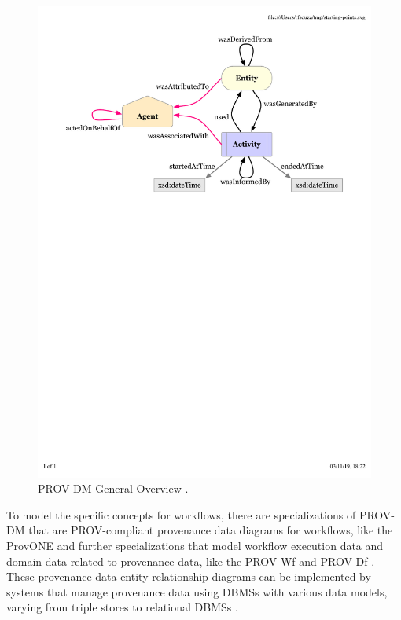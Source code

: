 \begin{figure}[H]
    \centering
    \includegraphics[width=\textwidth,keepaspectratio]{img/prov-dm.pdf}
    \caption{PROV-DM General Overview \cite{Groth2013W3C}.}
    \label{fig:prov_dm}
\end{figure}

To model the specific concepts for workflows, there are specializations of PROV-DM that are PROV-compliant provenance data diagrams for workflows, like the ProvONE \cite{ProvONE} and further specializations that model workflow execution data and
domain data related to provenance data,
like the PROV-Wf \cite{Costa2013Capturing} and PROV-Df \cite{Silva2017Raw}. These provenance data entity-relationship diagrams can
be implemented by systems that manage provenance data using DBMSs with various data models, varying from triple stores \cite{castro2015abordagem} to relational DBMSs \cite{DeOliveira2015How}.

